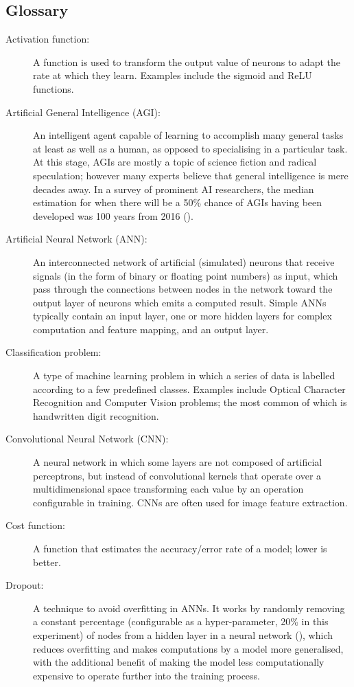 \documentclass[]{report}
\begin{document}
\subsection{Glossary}
\begin{description}
\item[Activation function:] A function is used to transform the output value of neurons to adapt the rate at which they learn. Examples include the sigmoid and ReLU functions.

\item[Artificial General Intelligence (AGI):] An intelligent agent capable of learning to accomplish many general tasks at least as well as a human, as opposed to specialising in a particular task. At this stage, AGIs are mostly a topic of science fiction and radical speculation; however many experts believe that general intelligence is mere decades away. In a survey of prominent AI researchers, the median estimation for when there will be a 50\% chance of AGIs having been developed was 100 years from 2016 (\cite{grace2017will}).

\item[Artificial Neural Network (ANN):] An interconnected network of artificial (simulated) neurons that receive signals (in the form of binary or floating point numbers) as input, which pass through the connections between nodes in the network toward the output layer of neurons which emits a computed result. Simple ANNs typically contain an input layer, one or more hidden layers for complex computation and feature mapping, and an output layer.

\item[Classification problem:] A type of machine learning problem in which a series of data is labelled according to a few predefined classes. Examples include Optical Character Recognition and Computer Vision problems; the most common of which is handwritten digit recognition.

\item[Convolutional Neural Network (CNN):] A neural network in which some layers are not composed of artificial perceptrons, but instead of convolutional kernels that operate over a multidimensional space transforming each value by an operation configurable in training. CNNs are often used for image feature extraction.

\item[Cost function:] A function that estimates the accuracy/error rate of a model; lower is better.

\item[Dropout:] A technique to avoid overfitting in ANNs. It works by randomly removing a constant percentage (configurable as a hyper-parameter, 20\% in this experiment) of nodes from a hidden layer in a neural network (\cite{dropout14}), which reduces overfitting and makes computations by a model more generalised, with the additional benefit of making the model less computationally expensive to operate further into the training process.


\end{description}
\end{document}
